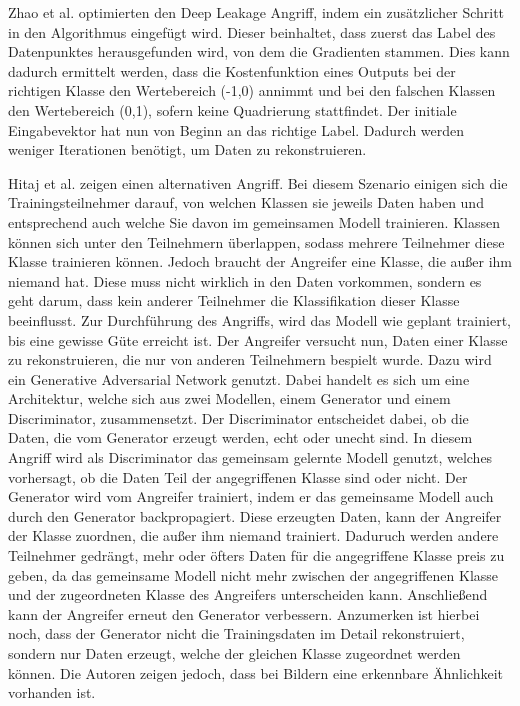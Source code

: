 Zhao et al. \cite{P-19} optimierten den Deep Leakage Angriff, indem ein zusätzlicher Schritt in den Algorithmus eingefügt wird.
Dieser beinhaltet, dass zuerst das Label des Datenpunktes herausgefunden wird, von dem die Gradienten stammen.
Dies kann dadurch ermittelt werden, dass die Kostenfunktion eines Outputs bei der richtigen Klasse den Wertebereich (-1,0) annimmt und bei den falschen Klassen den Wertebereich (0,1), sofern keine Quadrierung stattfindet.
Der initiale Eingabevektor hat nun von Beginn an das richtige Label. 
Dadurch werden weniger Iterationen benötigt, um Daten zu rekonstruieren.


Hitaj et al. \cite{P-81} zeigen einen alternativen Angriff.
Bei diesem Szenario einigen sich die Trainingsteilnehmer darauf, von welchen Klassen sie jeweils Daten haben und entsprechend auch welche Sie davon im gemeinsamen Modell trainieren.
Klassen können sich unter den Teilnehmern überlappen, sodass mehrere Teilnehmer diese Klasse trainieren können.
Jedoch braucht der Angreifer eine Klasse, die außer ihm niemand hat.
Diese muss nicht wirklich in den Daten vorkommen, sondern es geht darum, dass kein anderer Teilnehmer die Klassifikation dieser Klasse beeinflusst.
Zur Durchführung des Angriffs, wird das Modell wie geplant trainiert, bis eine gewisse Güte erreicht ist.
Der Angreifer versucht nun, Daten einer Klasse zu rekonstruieren, die nur von anderen Teilnehmern bespielt wurde.
Dazu wird ein Generative Adversarial Network \cite{P-86} genutzt.
Dabei handelt es sich um eine Architektur, welche sich aus zwei Modellen, einem Generator und einem Discriminator, zusammensetzt.
Der Discriminator entscheidet dabei, ob die Daten, die vom Generator erzeugt werden, echt oder unecht sind. 
In diesem Angriff wird als Discriminator das gemeinsam gelernte Modell genutzt, welches vorhersagt, ob die Daten Teil der angegriffenen Klasse sind oder nicht.
Der Generator wird vom Angreifer trainiert, indem er das gemeinsame Modell auch durch den Generator backpropagiert.
Diese erzeugten Daten, kann der Angreifer der Klasse zuordnen, die außer ihm niemand trainiert. 
Daduruch werden andere Teilnehmer gedrängt, mehr oder öfters Daten für die angegriffene Klasse preis zu geben, da das gemeinsame Modell nicht mehr zwischen der angegriffenen Klasse und der zugeordneten Klasse des Angreifers unterscheiden kann.
Anschließend kann der Angreifer erneut den Generator verbessern.
Anzumerken ist hierbei noch, dass der Generator nicht die Trainingsdaten im Detail rekonstruiert, sondern nur Daten erzeugt, welche der gleichen Klasse zugeordnet werden können.
Die Autoren zeigen jedoch, dass bei Bildern eine erkennbare Ähnlichkeit vorhanden ist.